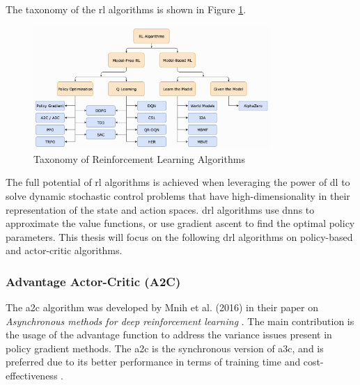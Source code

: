 The taxonomy of the \acrshort{rl} algorithms is shown in Figure \ref{fig:rl_taxonomy}.
\begin{figure}[h]
    \centering
    \includegraphics[width=0.8\textwidth]{figures/rl-taxonomy.png}
    \caption{Taxonomy of Reinforcement Learning Algorithms \cite{Achiam2018}}
    \label{fig:rl_taxonomy}
\end{figure}

The full potential of \acrlong{rl} algorithms is achieved when leveraging the power of \acrlong{dl} to solve dynamic stochastic control problems that have high-dimensionality in their representation of the state and action spaces. \acrshort{drl} algorithms use \acrshort{dnn}s to approximate the value functions, or use gradient ascent to find the optimal policy parameters. This thesis will focus on the following \acrshort{drl} algorithms on policy-based and actor-critic algorithms.

\subsubsection{Advantage Actor-Critic (A2C)} \label{sec:a2c}

The \acrfull{a2c} algorithm was developed by Mnih et al. (2016) in their paper on \textit{Asynchronous methods for deep reinforcement learning} \cite{Mnih2016}. The main contribution is the usage of the advantage function to address the variance issues present in policy gradient methods. The \acrshort{a2c} is the synchronous version of \acrshort{a3c}, and is preferred due to its better performance in terms of training time and cost-effectiveness \cite{Wu2017}.

